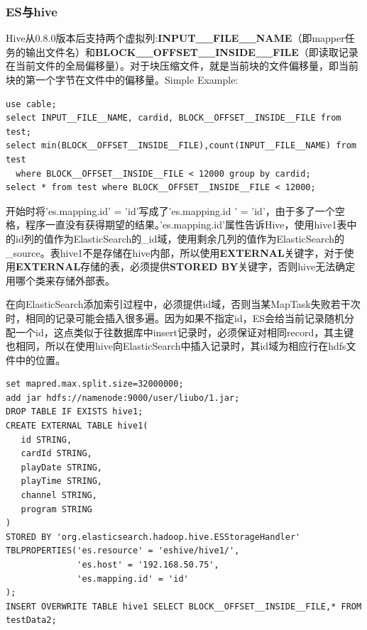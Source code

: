 \subsubsection{ES与hive}
\par Hive从0.8.0版本后支持两个虚拟列:\textbf{INPUT\_\_FILE\_\_NAME}（即mapper任务的输出文件名）和\textbf{BLOCK\_\_OFFSET\_\_INSIDE\_\_FILE}（即读取记录在当前文件的全局偏移量）。对于块压缩文件，就是当前块的文件偏移量，即当前块的第一个字节在文件中的偏移量。Simple Example:
\begin{verbatim}
use cable;
select INPUT__FILE__NAME, cardid, BLOCK__OFFSET__INSIDE__FILE from test;
select min(BLOCK__OFFSET__INSIDE__FILE),count(INPUT__FILE__NAME) from test
  where BLOCK__OFFSET__INSIDE__FILE < 12000 group by cardid;
select * from test where BLOCK__OFFSET__INSIDE__FILE < 12000;
\end{verbatim}
\par 开始时将'es.mapping.id' = 'id'写成了'es.mapping.id ' = 'id'，由于多了一个空格，程序一直没有获得期望的结果。'es.mapping.id'属性告诉Hive，使用hive1表中的id列的值作为ElasticSearch的\_id域，使用剩余几列的值作为ElasticSearch的\_source。表hive1不是存储在hive内部，所以使用\textbf{EXTERNAL}关键字，对于使用\textbf{EXTERNAL}存储的表，必须提供\textbf{STORED BY}关键字，否则hive无法确定用哪个类来存储外部表。
\par 在向ElasticSearch添加索引过程中，必须提供id域，否则当某MapTask失败若干次时，相同的记录可能会插入很多遍。因为如果不指定id，ES会给当前记录随机分配一个id，这点类似于往数据库中insert记录时，必须保证对相同record，其主键也相同，所以在使用hive向ElasticSearch中插入记录时，其id域为相应行在hdfs文件中的位置。
\begin{verbatim}
set mapred.max.split.size=32000000;
add jar hdfs://namenode:9000/user/liubo/1.jar;
DROP TABLE IF EXISTS hive1;
CREATE EXTERNAL TABLE hive1(
   id STRING,
   cardId STRING, 
   playDate STRING, 
   playTime STRING,
   channel STRING, 
   program STRING
)
STORED BY 'org.elasticsearch.hadoop.hive.ESStorageHandler'
TBLPROPERTIES('es.resource' = 'eshive/hive1/',
              'es.host' = '192.168.50.75',
              'es.mapping.id' = 'id'
);
INSERT OVERWRITE TABLE hive1 SELECT BLOCK__OFFSET__INSIDE__FILE,* FROM testData2;
\end{verbatim}
